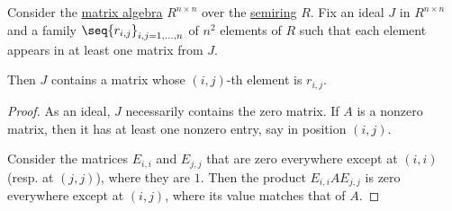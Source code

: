 \begin{proposition}\label{thm:elements_of_matrix_algebra_ideal}
  Consider the \hyperref[thm:matrix_algebra]{matrix algebra} \( R^{n \times n} \) over the \hyperref[def:semiring]{semiring} \( R \). Fix an ideal \( J \) in \( R^{n \times n} \) and a family \( \seq{ r_{i,j} }_{i, j = 1, \ldots, n} \) of \( n^2 \) elements of \( R \) such that each element appears in at least one matrix from \( J \).

  Then \( J \) contains a matrix whose \( (i, j) \)-th element is \( r_{i, j} \).
\end{proposition}
\begin{proof}
  As an ideal, \( J \) necessarily contains the zero matrix. If \( A \) is a nonzero matrix, then it has at least one nonzero entry, say in position \( (i, j) \).

  Consider the matrices \( E_{i,i} \) and \( E_{j,j} \) that are zero everywhere except at \( (i, i) \) (resp. at \( (j, j) \)), where they are \( 1 \). Then the product \( E_{i,i} A E_{j,j} \) is zero everywhere except at \( (i, j) \), where its value matches that of \( A \).


\end{proof}
